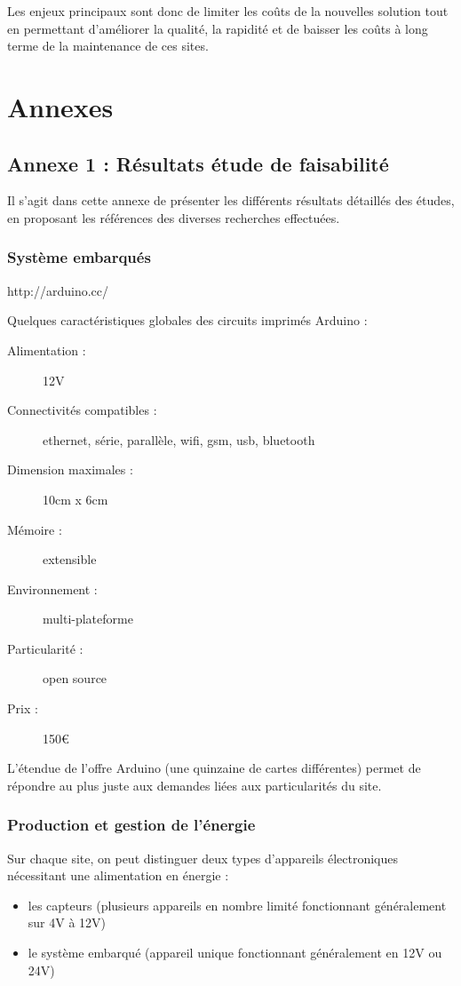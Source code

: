 \documentclass{article}
\begin{document}
Les enjeux principaux sont donc de limiter les coûts de la nouvelles
solution tout en permettant d’améliorer la qualité, la rapidité et de
baisser les coûts à long terme de la maintenance de ces sites.




\section{Annexes}
\subsection{Annexe 1 : Résultats étude de faisabilité}
Il s’agit dans cette annexe de présenter les différents résultats
détaillés des études, en proposant les références des diverses
recherches effectuées.

\subsubsection{Système embarqués}
http://arduino.cc/

Quelques caractéristiques globales des circuits imprimés Arduino :

\begin{description}
\item[Alimentation :] 12V
\item[Connectivités compatibles :] ethernet, série, parallèle, wifi, gsm,
usb, bluetooth
\item[Dimension maximales :] 10cm x 6cm
\item[Mémoire :] extensible
\item[Environnement :] multi-plateforme
\item[Particularité :] open source
\item[Prix :] 150€
\end{description}



L’étendue de l’offre Arduino (une quinzaine de cartes différentes)
permet de répondre au plus juste aux demandes liées aux particularités
du site.

\subsubsection{Production et gestion de l’énergie}
Sur chaque site, on peut distinguer deux types d’appareils électroniques
nécessitant une alimentation en énergie :
\begin{itemize}
\item les capteurs (plusieurs appareils en nombre limité fonctionnant
généralement sur 4V à 12V)
\item le système embarqué (appareil unique fonctionnant généralement en
12V ou 24V)
\end{itemize}
\end{document}
